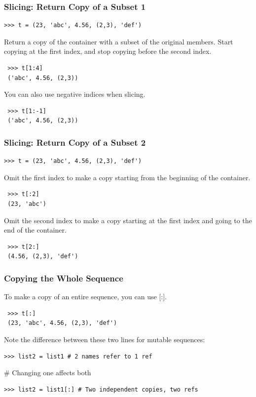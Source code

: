 \documentclass[12pt,handout]{beamer}
\begin{document}
\begin{frame}[fragile]
\frametitle{Slicing: Return Copy of a Subset 1}
\small{
\begin{verbatim}
>>> t = (23, 'abc', 4.56, (2,3), 'def')
\end{verbatim}
}
Return a copy of the container with a subset of the original
members. Start copying at the first index, and stop copying
before the second index.
\small{
\begin{verbatim}
 >>> t[1:4]
 ('abc', 4.56, (2,3))
\end{verbatim}
}
You can also use negative indices when slicing.
\small{
\begin{verbatim}
 >>> t[1:-1]
 ('abc', 4.56, (2,3))
\end{verbatim}
}
\end{frame}


\begin{frame}[fragile]
\frametitle{Slicing: Return Copy of a Subset 2}
\small{
\begin{verbatim}
>>> t = (23, 'abc', 4.56, (2,3), 'def')
\end{verbatim}
}
Omit the first index to make a copy starting from the beginning
of the container.
\small{
\begin{verbatim}
 >>> t[:2]
 (23, 'abc')
\end{verbatim}
}
Omit the second index to make a copy starting at the first index
and going to the end of the container.
\small{
\begin{verbatim}
 >>> t[2:]
 (4.56, (2,3), 'def')
\end{verbatim}
}
\end{frame}


\begin{frame}[fragile]
\frametitle{Copying the Whole Sequence}
To make a copy of an entire sequence, you can use [:].
\small{
\begin{verbatim}
 >>> t[:]
 (23, 'abc', 4.56, (2,3), 'def')
\end{verbatim}
}
Note the difference between these two lines for mutable
sequences:
\small{
\begin{verbatim}
>>> list2 = list1 # 2 names refer to 1 ref
\end{verbatim}
}
\# Changing one affects both
\small{
\begin{verbatim}
>>> list2 = list1[:] # Two independent copies, two refs
\end{verbatim}
}
\end{frame}
\end{document}
